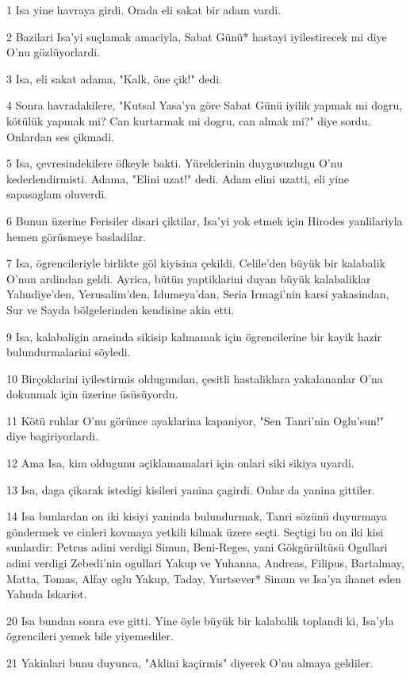 \par 1 Isa yine havraya girdi. Orada eli sakat bir adam vardi.
\par 2 Bazilari Isa'yi suçlamak amaciyla, Sabat Günü* hastayi iyilestirecek mi diye O'nu gözlüyorlardi.
\par 3 Isa, eli sakat adama, "Kalk, öne çik!" dedi.
\par 4 Sonra havradakilere, "Kutsal Yasa'ya göre Sabat Günü iyilik yapmak mi dogru, kötülük yapmak mi? Can kurtarmak mi dogru, can almak mi?" diye sordu. Onlardan ses çikmadi.
\par 5 Isa, çevresindekilere öfkeyle bakti. Yüreklerinin duygusuzlugu O'nu kederlendirmisti. Adama, "Elini uzat!" dedi. Adam elini uzatti, eli yine sapasaglam oluverdi.
\par 6 Bunun üzerine Ferisiler disari çiktilar, Isa'yi yok etmek için Hirodes yanlilariyla hemen görüsmeye basladilar.
\par 7 Isa, ögrencileriyle birlikte göl kiyisina çekildi. Celile'den büyük bir kalabalik O'nun ardindan geldi. Ayrica, bütün yaptiklarini duyan büyük kalabaliklar Yahudiye'den, Yerusalim'den, Idumeya'dan, Seria Irmagi'nin karsi yakasindan, Sur ve Sayda bölgelerinden kendisine akin etti.
\par 9 Isa, kalabaligin arasinda sikisip kalmamak için ögrencilerine bir kayik hazir bulundurmalarini söyledi.
\par 10 Birçoklarini iyilestirmis oldugundan, çesitli hastaliklara yakalananlar O'na dokunmak için üzerine üsüsüyordu.
\par 11 Kötü ruhlar O'nu görünce ayaklarina kapaniyor, "Sen Tanri'nin Oglu'sun!" diye bagiriyorlardi.
\par 12 Ama Isa, kim oldugunu açiklamamalari için onlari siki sikiya uyardi.
\par 13 Isa, daga çikarak istedigi kisileri yanina çagirdi. Onlar da yanina gittiler.
\par 14 Isa bunlardan on iki kisiyi yaninda bulundurmak, Tanri sözünü duyurmaya göndermek ve cinleri kovmaya yetkili kilmak üzere seçti. Seçtigi bu on iki kisi sunlardir: Petrus adini verdigi Simun, Beni-Reges, yani Gökgürültüsü Ogullari adini verdigi Zebedi'nin ogullari Yakup ve Yuhanna, Andreas, Filipus, Bartalmay, Matta, Tomas, Alfay oglu Yakup, Taday, Yurtsever* Simun ve Isa'ya ihanet eden Yahuda Iskariot.
\par 20 Isa bundan sonra eve gitti. Yine öyle büyük bir kalabalik toplandi ki, Isa'yla ögrencileri yemek bile yiyemediler.
\par 21 Yakinlari bunu duyunca, "Aklini kaçirmis" diyerek O'nu almaya geldiler.
